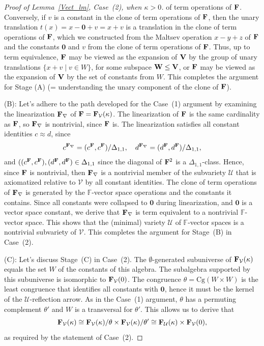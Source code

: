 \documentclass[12pt]{amsart}
\theoremstyle{definition}
\numberwithin{equation}{section}
\newcommand{\m}[1]{{\mathbf{\uppercase{#1}}}}
\newcommand{\cg}{\mathrm{Cg}}
\begin{document}
\begin{proof}[Proof of Lemma~\ref{Vect_lm}, Case~(2), when $\kappa>0$]
of term operations of $\m f$. Conversely, if $v$
is a constant in the clone of term operations of
$\m f$, then the unary translation
$t(x) = x-\mathbf{0}+v = x+v$ is a translation in the clone
of term operations of $\m f$, which we constructed
from the Maltsev operation $x-y+z$ of $\m f$ and
the constants $\mathbf{0}$ and $v$ from the clone
of term operations of $\m f$.
Thus, up to term equivalence, $\m f$ may be viewed
as the expansion of $\m v$ by the group of unary
translations $\{x+v\;|\;v\in W\}$, for some subspace $\m w\leq \m v$,
or $\m f$ may be viewed
as the expansion of $\m v$ by the set of constants
from $W$. This completes the argument for Stage (A)
(= understanding the unary component of the clone
of $\m f$).

(B): Let's adhere to the path developed for the
Case~(1) argument by examining
the linearization $\m f_{\nabla}$
of $\m f = \m f_{\mathcal{V}}(\kappa)$.
The linearization of $\m f$ is the same cardinality
as $\m f$, so $\m f_{\nabla}$ is nontrivial, since $\m f$ is.
The linearization satisfies all constant identities
$c\approx d$, since
\[
c^{\m f_{\nabla}} = (c^{\m f},c^{\m f})/\Delta_{1,1}, \quad
d^{\m f_{\nabla}} = (d^{\m f},d^{\m f})/\Delta_{1,1}, 
\]
and $((c^{\m f},c^{\m f}),(d^{\m f},d^{\m f})\in\Delta_{1,1}$
since the diagonal of $\m f^2$ is a $\Delta_{1,1}$-class.
Hence, since $\m f$ is nontrivial, then
$\m f_{\nabla}$ is a nontrivial member
of the subvariety $\mathcal{U}$
that is axiomatized relative to $\mathcal{V}$
by all constant identities.
The clone of term operations of
$\m f_{\nabla}$ is generated by the $\mathbb{F}$-vector space
operations and the constants it contains.
Since all constants were collapsed
to $\mathbf{0}$ during linearization,
and $\mathbf{0}$ is a vector space constant,
we derive that $\m f_{\nabla}$ is term equivalent
to a nontrivial $\mathbb{F}$-vector space.
This shows that the (minimal) variety $\mathcal{U}$ of
$\mathbb{F}$-vector spaces is a nontrivial
subvariety of $\mathcal{V}$.
This completes the argument for Stage~(B) in Case~(2).

(C): Let's discuss Stage~(C) in Case~(2).
The $\emptyset$-generated subuniverse of
$\m f_{\mathcal{V}}(\kappa)$ equals the set $W$ of
the constants of this algebra.
The subalgebra supported
by this subuniverse
is isomorphic to $\m f_{\mathcal{V}}(0)$.
The congruence $\theta = \cg(W\times W)$
is the least congruence that identifies
all constants with $\mathbf{0}$,
hence it must be the kernel of the
$\mathcal{U}$-reflection arrow.
As in the Case~(1) argument,
$\theta$ has a permuting complement $\theta'$
and $W$ is a transversal for $\theta'$.
This allows us to derive that
\[
\m f_{\mathcal{V}}(\kappa) \cong 
\m f_{\mathcal{V}}(\kappa)/\theta\times  
\m f_{\mathcal{V}}(\kappa)/\theta'\cong 
\m f_{\mathcal{U}}(\kappa) \times
\m f_{\mathcal{V}}(0),
\]
as required by the statement of Case~(2).


\end{proof}
\end{document}
